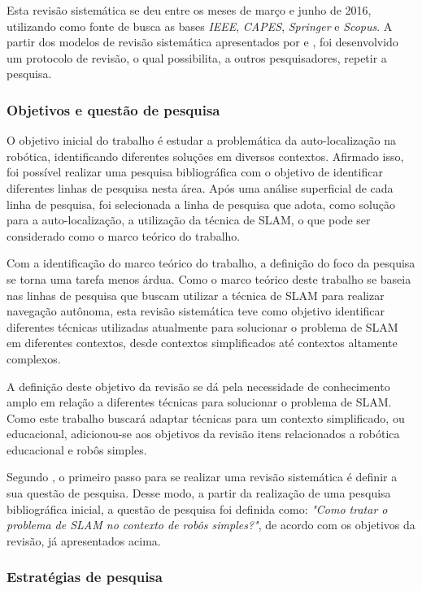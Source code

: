 		Esta revisão sistemática se deu entre os meses de março e junho de 2016, utilizando como fonte de busca as bases \textit{IEEE}, \textit{CAPES}, \textit{Springer} e \textit{Scopus}. A partir dos modelos de revisão sistemática apresentados por \cite{Kitchenham} e \cite{exemploRevisaoSistematica}, foi desenvolvido um protocolo de revisão, o qual possibilita, a outros pesquisadores, repetir a pesquisa.

		\subsubsection{Objetivos e questão de pesquisa}
		
		O objetivo inicial do trabalho é estudar a problemática da auto-localização na robótica, identificando diferentes soluções em diversos contextos. Afirmado isso, foi possível realizar uma pesquisa bibliográfica com o objetivo de identificar diferentes linhas de pesquisa nesta área. Após uma análise superficial de cada linha de pesquisa, foi selecionada a linha de pesquisa que adota, como solução para a auto-localização, a utilização da técnica de SLAM, o que pode ser considerado como o marco teórico do trabalho. 

		Com a identificação do marco teórico do trabalho, a definição do foco da pesquisa se torna uma tarefa menos árdua. Como o marco teórico deste trabalho se baseia nas linhas de pesquisa que buscam utilizar a técnica de SLAM para realizar navegação autônoma, esta revisão sistemática teve como objetivo identificar diferentes técnicas utilizadas atualmente para solucionar o problema de SLAM em diferentes contextos, desde contextos simplificados até contextos altamente complexos.

		A definição deste objetivo da revisão se dá pela necessidade de conhecimento amplo em relação a diferentes técnicas para solucionar o problema de SLAM. Como este trabalho buscará adaptar técnicas para um contexto simplificado, ou educacional, adicionou-se aos objetivos da revisão itens relacionados a robótica educacional e robôs simples.

		Segundo \cite{Kitchenham}, o primeiro passo para se realizar uma revisão sistemática é definir a sua questão de pesquisa. Desse modo, a partir da realização de uma pesquisa bibliográfica inicial, a questão de pesquisa foi definida como: \textit{"Como tratar o problema de SLAM no contexto de robôs simples?"}, de acordo com os objetivos da revisão, já apresentados acima.


		\subsubsection{Estratégias de pesquisa}

